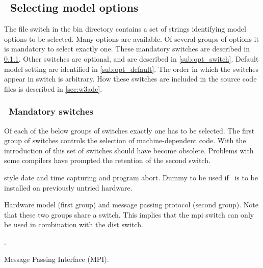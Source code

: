 \vssub
\subsection{~Selecting model options} \label{sec:switches}
\vssub

The file {\file switch} in the {\file bin} directory contains a set of strings
identifying model options to be selected. Many options are available. Of
several groups of options it is mandatory to select exactly one. These
mandatory switches are described in \para\ref{sub:man_switch}. Other switches
are optional, and are described in \para\ref{sub:opt_switch}. Default model
setting are identified in \para\ref{sub:opt_default}. The order in which the
switches appear in {\file switch} is arbitrary. How these switches are
included in the source code files is described in \para\ref{sec:w3adc}.

\vsssub
\subsubsection{~Mandatory switches} \label{sub:man_switch}
\vsssub

Of each of the below groups of switches exactly one has to be selected. The
first group of switches controls the selection of machine-dependent code. With
the introduction of  this set of switches should have become
obsolete. Problems with some compilers have prompted the retention of the
second switch.
\begin{slist}
 { style date and time capturing and program
           abort.}
 {Dummy to be used if \ws\ is to be installed on
           previously untried hardware.}
\end{slist}

\noindent
Hardware model (first group) and message passing protocol (second group). Note
that these two groups share a switch. This implies that the {\sc mpi} switch
can only be used in combination with the {\sc dist} switch.
\begin{slist}
.
\end{slist}

\begin{slist}
 {Message Passing Interface (MPI).}
\end{slist}

